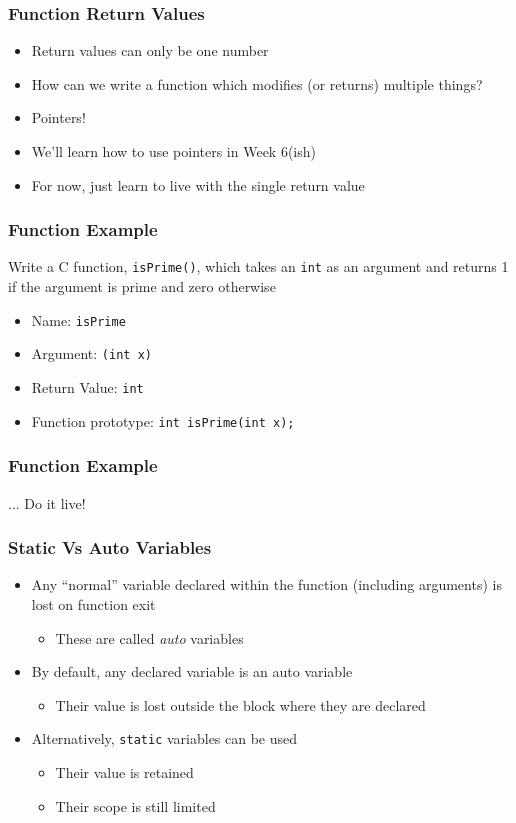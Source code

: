 \documentclass[14pt]{beamer}
\begin{document}
\begin{frame}
\frametitle{Function Return Values}
\begin{itemize}
\item Return values can only be one number
\item How can we write a function which modifies (or returns) multiple things?
\pause
\item Pointers!
\pause
\item We'll learn how to use pointers in Week 6(ish)
\item For now, just learn to live with the single return value
\end{itemize}
\end{frame}

\begin{frame}
\frametitle{Function Example}
Write a C function, \texttt{isPrime()}, which takes an \texttt{int} as an argument and returns 1 if the argument is prime and zero otherwise
\begin{itemize}
\item Name: \texttt{isPrime}
\item Argument: \texttt{(int x)}
\item Return Value: \texttt{int}
\pause
\item Function prototype: \texttt{int~isPrime(int~x);}
\end{itemize}
\end{frame}

\begin{frame}
\frametitle{Function Example}
\begin{center}
... Do it live!
\end{center}
\end{frame}

\begin{frame}
\frametitle{Static Vs Auto Variables}
\begin{itemize}
\item Any ``normal'' variable declared within the function (including arguments) is lost on function exit
	\begin{itemize}
		\item These are called \textit{auto} variables
	\end{itemize}
\item By default, any declared variable is an auto variable
	\begin{itemize}
		\item Their value is lost outside the block where they are declared
	\end{itemize}
\pause
\item Alternatively, \texttt{static} variables can be used
 \begin{itemize}
 	\pause
 	\item Their value is retained
 	\pause
 	\item Their scope is still limited
 \end{itemize}
\end{itemize}
\end{frame}
\end{document}
